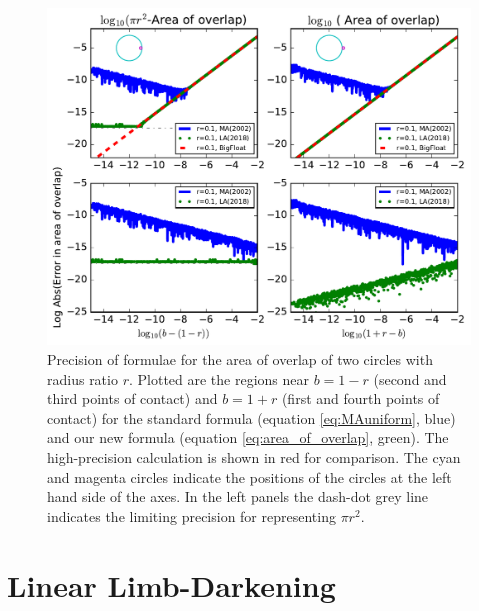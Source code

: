 \documentclass[modern]{aastex61}
\begin{document}
\begin{figure}
    \begin{centering}
    \includegraphics[width=\linewidth]{figures/julia/area_of_overlap.pdf}
    \caption{Precision of formulae for the area of overlap of two circles with
    radius ratio $r$.  Plotted are the regions near $b=1-r$ (second and third
    points of contact) and $b=1+r$ (first and fourth points of contact) for
    the standard formula (equation \ref{eq:MAuniform}, blue) and our new formula 
    (equation \ref{eq:area_of_overlap}, green). 
    The high-precision calculation is shown in red for comparison. The
    cyan and magenta circles indicate the positions of the circles at the left
    hand side of the axes.  In the left panels the dash-dot grey line indicates the 
    limiting precision for representing $\pi r^2$.}\label{fig:overlap_precision}
    \end{centering}
\end{figure}

\section{Linear Limb-Darkening}
\label{sec:reparam}
\end{document}
